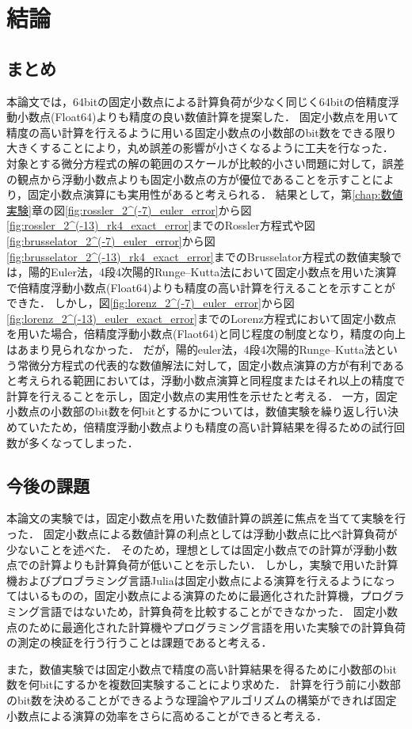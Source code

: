 \chapter{結論}
\label{chap:結論}
\section{まとめ}
本論文では，64bitの固定小数点による計算負荷が少なく同じく64bitの倍精度浮動小数点(Float64)よりも精度の良い数値計算を提案した．
固定小数点を用いて精度の高い計算を行えるように用いる固定小数点の小数部のbit数をできる限り大きくすることにより，丸め誤差の影響が小さくなるように工夫を行なった．
対象とする微分方程式の解の範囲のスケールが比較的小さい問題に対して，誤差の観点から浮動小数点よりも固定小数点の方が優位であることを示すことにより，固定小数点演算にも実用性があると考えられる．
結果として，第\ref{chap:数値実験}章の図\ref{fig:rossler_2^(-7)_euler_error}から図\ref{fig:rossler_2^(-13)_rk4_exact_error}までのRossler方程式や図\ref{fig:brusselator_2^(-7)_euler_error}から図\ref{fig:brusselator_2^(-13)_rk4_exact_error}までのBrusselator方程式の数値実験では，陽的Euler法，4段4次陽的Runge--Kutta法において固定小数点を用いた演算で倍精度浮動小数点(Float64)よりも精度の高い計算を行えることを示すことができた．
しかし，図\ref{fig:lorenz_2^(-7)_euler_error}から図\ref{fig:lorenz_2^(-13)_euler_exact_error}までのLorenz方程式において固定小数点を用いた場合，倍精度浮動小数点(Flaot64)と同じ程度の制度となり，精度の向上はあまり見られなかった．
だが，陽的euler法，4段4次陽的Runge--Kutta法という常微分方程式の代表的な数値解法に対して，固定小数点演算の方が有利であると考えられる範囲においては，浮動小数点演算と同程度またはそれ以上の精度で計算を行えることを示し，固定小数点の実用性を示せたと考える．
一方，固定小数点の小数部のbit数を何bitとするかについては，数値実験を繰り返し行い決めていたため，倍精度浮動小数点よりも精度の高い計算結果を得るための試行回数が多くなってしまった．

\section{今後の課題}
本論文の実験では，固定小数点を用いた数値計算の誤差に焦点を当てて実験を行った．
固定小数点による数値計算の利点としては浮動小数点に比べ計算負荷が少ないことを述べた．
そのため，理想としては固定小数点での計算が浮動小数点での計算よりも計算負荷が低いことを示したい．
しかし，実験で用いた計算機およびプロブラミング言語Juliaは固定小数点による演算を行えるようになってはいるものの，固定小数点による演算のために最適化された計算機，プログラミング言語ではないため，計算負荷を比較することができなかった．
固定小数点のために最適化された計算機やプログラミング言語を用いた実験での計算負荷の測定の検証を行う行うことは課題であると考える．


また，数値実験では固定小数点で精度の高い計算結果を得るために小数部のbit数を何bitにするかを複数回実験することにより求めた．
計算を行う前に小数部のbit数を決めることができるような理論やアルゴリズムの構築ができれば固定小数点による演算の効率をさらに高めることができると考える．